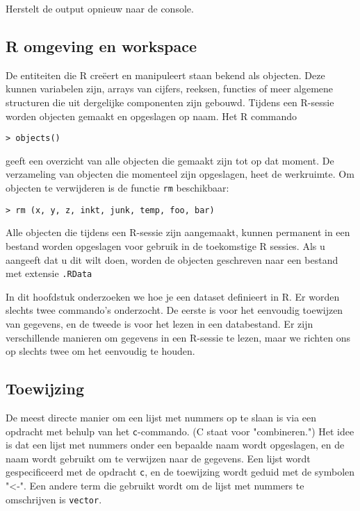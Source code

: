 Herstelt de output opnieuw naar de console.

\subsection{R omgeving en workspace}

De entiteiten die R creëert en manipuleert staan bekend als objecten. Deze kunnen variabelen zijn, arrays
van cijfers, reeksen, functies of meer algemene structuren die uit dergelijke componenten zijn gebouwd.
Tijdens een R-sessie worden objecten gemaakt en opgeslagen op naam. Het R commando

\begin{lstlisting}
> objects()
\end{lstlisting}

geeft een overzicht van alle objecten die gemaakt zijn tot op dat moment.
De verzameling van objecten die momenteel zijn opgeslagen, heet de werkruimte.
Om objecten te verwijderen is de functie \texttt{rm} beschikbaar:

\begin{lstlisting}
> rm (x, y, z, inkt, junk, temp, foo, bar)
\end{lstlisting}

Alle objecten die tijdens een R-sessie zijn aangemaakt, kunnen permanent in een bestand worden opgeslagen voor gebruik in de toekomstige
R sessies. Als u aangeeft dat u dit wilt doen, worden de objecten geschreven naar een bestand met extensie \texttt{.RData}

In dit hoofdstuk onderzoeken we hoe je een dataset definieert in R. Er worden slechts twee commando's onderzocht. De eerste is voor het eenvoudig toewijzen van gegevens, en de tweede is voor het lezen in een databestand. Er zijn verschillende manieren om gegevens in een R-sessie te lezen, maar we richten ons op slechts twee om het eenvoudig te houden.

\subsection{Toewijzing}

De meest directe manier om een lijst met nummers op te slaan is via een opdracht met behulp van het \texttt{c}-commando. (C staat voor "combineren.") Het idee is dat een lijst met nummers onder een bepaalde naam wordt opgeslagen, en de naam wordt gebruikt om te verwijzen naar de gegevens. Een lijst wordt gespecificeerd met de opdracht \texttt{c}, en de toewijzing wordt geduid met de symbolen "<-". Een andere term die gebruikt wordt om de lijst met nummers te omschrijven is \texttt{vector}.

